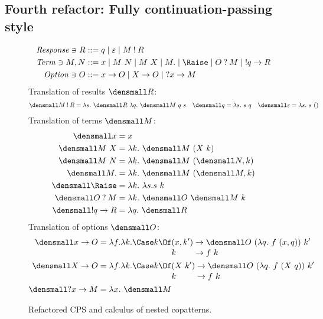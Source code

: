\documentclass[sigplan,screen]{acmart}
\begin{document}
\subsection{Fourth refactor: Fully continuation-passing style}

\begin{figure}
\centering
\footnotesize
\begin{alignat*}{2}
  \mathit{Response} \ni
  R
  &::= q
  \mid \varepsilon
  \mid M \ans R
  \\
  \mathit{Term} \ni M, N
  &::= x
  \mid M ~ N
  \mid M ~ X
  \mid M.
  \mid \Raise
  \mid O \ask M
  \mid \ans q \to R
  \\
  \mathit{Option} \ni O
  &::= x \to O
  \mid X \to O
  \mid \ask x \to M
\end{alignat*}
Translation of results $\den{R}$:
\begin{align*}
  \den{M \ans R} &= \lambda s.~ \den{R} ~ \lambda q.~ \den{M} ~ q ~ s
  &
  \den{q} &= \lambda s.~ s ~ q
  &
  \den{\varepsilon} &= \lambda s.~ s ~ ()
\end{align*}
Translation of terms $\den{M}$:
\begin{align*}
  \den{x} &= x
  \\
  \den{M~X} &= \lambda k.~ \den{M}~(X~k)
  \\
  \den{M~N} &= \lambda k.~ \den{M}~(\den{N}, k)
  \\
  \den{M.} &= \lambda k.~ \den{M}~(\den{M}, k)
  \\
  \den{\Raise} &= \lambda k.~ \lambda s. s ~ k
  \\
  \den{O \ask M} &= \lambda k.~ \den{O} ~ \den{M} ~ k
  \\
  \den{\ans q \to R} &= \lambda q.~ \den{R}
\end{align*}
Translation of options $\den{O}$:
\begin{align*}
  \den{x \to O}
  &=
  \lambda f. \lambda k.
  \begin{alignedat}[t]{2}
    \Case k \Of
    &(x, k') &&\to \den{O} ~ (\lambda q.~ f~(x, q)) ~ k'
    \\[-0.5ex]
    &k &&\to f ~ k
  \end{alignedat}
  \\
  \den{X \to O}
  &=
  \lambda f. \lambda k.
  \begin{alignedat}[t]{2}
    \Case k \Of
    &(X~k') &&\to \den{O} ~ (\lambda q.~ f~(X~q)) ~ k'
    \\[-0.5ex]
    &k &&\to f ~ k
  \end{alignedat}
  \\
  \den{\ask x \to M} &= \lambda x.~ \den{M}
\end{align*}
\caption{Refactored CPS and calculus of nested copatterns.}
\label{fig:nested-copat-cps}
\end{figure}
\end{document}

